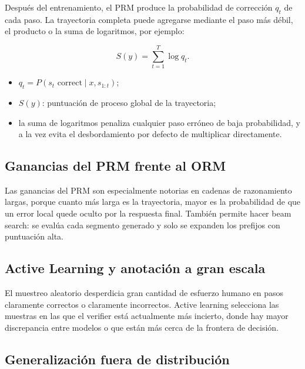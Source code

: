 \documentclass[a4paper]{article}
\begin{document}
Después del entrenamiento, el PRM produce la probabilidad de corrección $q_t$ de cada paso. La trayectoria completa puede agregarse mediante el paso más débil, el producto o la suma de logaritmos, por ejemplo:

$$
S(y)=\sum_{t=1}^{T}\log q_t.
$$

\begin{itemize}
    \item $q_t=P(s_t\text{ correct}\mid x,s_{1:t})$;
    \item $S(y)$: puntuación de proceso global de la trayectoria;
    \item la suma de logaritmos penaliza cualquier paso erróneo de baja probabilidad, y a la vez evita el desbordamiento por defecto de multiplicar directamente.
\end{itemize}

\subsection{Ganancias del PRM frente al ORM}


Las ganancias del PRM son especialmente notorias en cadenas de razonamiento largas, porque cuanto más larga es la trayectoria, mayor es la probabilidad de que un error local quede oculto por la respuesta final. También permite hacer beam search: se evalúa cada segmento generado y solo se expanden los prefijos con puntuación alta.

\subsection{Active Learning y anotación a gran escala}

El muestreo aleatorio desperdicia gran cantidad de esfuerzo humano en pasos claramente correctos o claramente incorrectos. Active learning selecciona las muestras en las que el verifier está actualmente más incierto, donde hay mayor discrepancia entre modelos o que están más cerca de la frontera de decisión.


\subsection{Generalización fuera de distribución}
\end{document}

